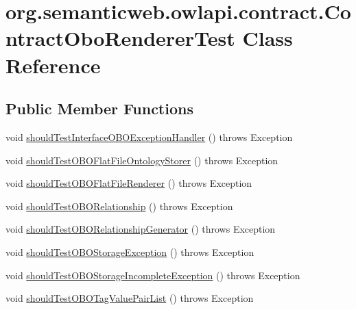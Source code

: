 \hypertarget{classorg_1_1semanticweb_1_1owlapi_1_1contract_1_1_contract_obo_renderer_test}{\section{org.\-semanticweb.\-owlapi.\-contract.\-Contract\-Obo\-Renderer\-Test Class Reference}
\label{classorg_1_1semanticweb_1_1owlapi_1_1contract_1_1_contract_obo_renderer_test}
}
\subsection*{Public Member Functions}
\begin{DoxyCompactItemize}
\item 
void \hyperlink{classorg_1_1semanticweb_1_1owlapi_1_1contract_1_1_contract_obo_renderer_test_aa6e8db46958b6f24798e2d793919b7eb}{should\-Test\-Interface\-O\-B\-O\-Exception\-Handler} ()  throws Exception 
\item 
void \hyperlink{classorg_1_1semanticweb_1_1owlapi_1_1contract_1_1_contract_obo_renderer_test_afb16b0ba19e7b246d86901107d6e2635}{should\-Test\-O\-B\-O\-Flat\-File\-Ontology\-Storer} ()  throws Exception 
\item 
void \hyperlink{classorg_1_1semanticweb_1_1owlapi_1_1contract_1_1_contract_obo_renderer_test_a6547731a1e67c6df0cf010cf4ea1a389}{should\-Test\-O\-B\-O\-Flat\-File\-Renderer} ()  throws Exception 
\item 
void \hyperlink{classorg_1_1semanticweb_1_1owlapi_1_1contract_1_1_contract_obo_renderer_test_ac20156846a64f20c70c754b12dc5a7cb}{should\-Test\-O\-B\-O\-Relationship} ()  throws Exception 
\item 
void \hyperlink{classorg_1_1semanticweb_1_1owlapi_1_1contract_1_1_contract_obo_renderer_test_ad5cfa11b40f9a17ddda0d9848f9f9787}{should\-Test\-O\-B\-O\-Relationship\-Generator} ()  throws Exception 
\item 
void \hyperlink{classorg_1_1semanticweb_1_1owlapi_1_1contract_1_1_contract_obo_renderer_test_a2cdcd85550b580481770a3ba11c4794d}{should\-Test\-O\-B\-O\-Storage\-Exception} ()  throws Exception 
\item 
void \hyperlink{classorg_1_1semanticweb_1_1owlapi_1_1contract_1_1_contract_obo_renderer_test_a317b4db7a150d7c212bd2897902eadda}{should\-Test\-O\-B\-O\-Storage\-Incomplete\-Exception} ()  throws Exception 
\item 
void \hyperlink{classorg_1_1semanticweb_1_1owlapi_1_1contract_1_1_contract_obo_renderer_test_a345a93fc456a21066a6dfb2760a88fba}{should\-Test\-O\-B\-O\-Tag\-Value\-Pair\-List} ()  throws Exception 
\end{DoxyCompactItemize}


